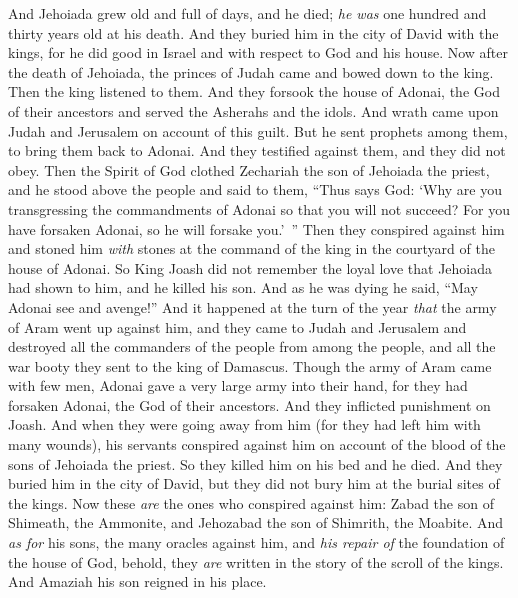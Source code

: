 \begin{biblechapter}
\verse And Jehoiada grew old and full of days, and he died; \textit{he was} one hundred and thirty years old at his death.
\verse And they buried him in the city of David with the kings, for he did good in Israel and with respect to God and his house.
\verse Now after the death of Jehoiada, the princes of Judah came and bowed down to the king. Then the king listened to them.
\verse And they forsook the house of Adonai, the God of their ancestors and served the Asherahs and the idols. And wrath came upon Judah and Jerusalem on account of this guilt.
\verse But he sent prophets among them, to bring them back to Adonai. And they testified against them, and they did not obey.
\verse Then the Spirit of God clothed Zechariah the son of Jehoiada the priest, and he stood above the people and said to them, “Thus says God: ‘Why are you transgressing the commandments of Adonai so that you will not succeed? For you have forsaken Adonai, so he will forsake you.’ ”
\verse Then they conspired against him and stoned him \textit{with} stones at the command of the king in the courtyard of the house of Adonai.
\verse So King Joash did not remember the loyal love that Jehoiada had shown to him, and he killed his son. And as he was dying he said, “May Adonai see and avenge!”
 And it happened at the turn of the year \textit{that} the army of Aram went up against him, and they came to Judah and Jerusalem and destroyed all the commanders of the people from among the people, and all the war booty they sent to the king of Damascus.
\verse Though the army of Aram came with few men, Adonai gave a very large army into their hand, for they had forsaken Adonai, the God of their ancestors. And they inflicted punishment on Joash.
\verse And when they were going away from him (for they had left him with many wounds), his servants conspired against him on account of the blood of the sons of Jehoiada the priest. So they killed him on his bed and he died. And they buried him in the city of David, but they did not bury him at the burial sites of the kings.
\verse Now these \textit{are} the ones who conspired against him: Zabad the son of Shimeath, the Ammonite, and Jehozabad the son of Shimrith, the Moabite.
\verse And \textit{as for} his sons, the many oracles against him, and \textit{his repair of} the foundation of the house of God, behold, they \textit{are} written in the story of the scroll of the kings. And Amaziah his son reigned in his place.
\end{biblechapter}

